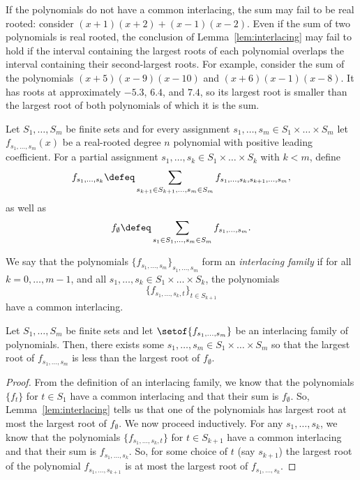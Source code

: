 \documentclass[11pt]{article}
\begin{document}
If the polynomials do not have a common interlacing, the sum may fail to be real rooted:
 consider $(x+1) (x+2) + (x-1) (x-2)$.
Even if the sum of two polynomials is real rooted, the conclusion of Lemma~\ref{lem:interlacing}
  may fail to hold if the interval containing the largest roots of each polynomial overlaps
  the interval containing their second-largest roots.
For example,
  consider the sum of the polynomials $(x+5) (x-9) (x-10)$ and
  $(x+6) (x-1) (x-8)$.
It has roots at approximately $-5.3$, $6.4$, and $7.4$, so 
  its largest root is smaller than the largest root of both polynomials
  of which it is the sum.

\begin{definition}\label{def:family}
Let $S_{1}, \dots , S_{m}$ be finite sets and for every assignment $s_{1}, \dots, s_{m} \in S_{1} \times \dots \times S_{m}$
  let $f_{s_{1}, \dots , s_{m}} (x)$ be a real-rooted degree $n$ polynomial with positive leading coefficient.
For a partial assignment $s_1, \dots, s_k \in S_1 \times \ldots \times S_k$ with $k < m$, define
\[
  f_{s_{1},\dots , s_{k}} \defeq
\sum_{s_{k+1} \in S_{k+1}, \dots , s_{m} \in S_{m}}
  f_{s_{1}, \dots ,s_{k}, s_{k+1}, \dots , s_{m}},
\]
as well as
\[
  f_{\emptyset} \defeq \sum_{s_{1} \in S_{1}, \dots , s_{m} \in S_{m}}
  f_{s_{1}, \dots , s_{m}}.
\]

We say that the polynomials $\{f_{s_{1}, \dots , s_{m}} \}_{s_{1}, \dots , s_{m}}$
  form an \textit{interlacing family} if for all $k=0,\ldots, m-1$, and all
  $s_{1}, \dots, s_{k} \in S_{1} \times \dots \times S_{k}$,
  the polynomials
\[
  \{f_{s_{1}, \dots , s_{k},t}\}_{t\in S_{k+1}}
\]
have a common interlacing.
\end{definition}

\begin{theorem}\label{thm:interlacing}
Let $S_{1}, \dots , S_{m}$
  be finite sets and let
 $\setof{f_{s_{1}, \dots , s_{m}} }$ be an interlacing family of polynomials.
Then, there exists some $s_{1},\dots , s_{m} \in S_{1} \times \dots \times S_{m}$
  so that the largest root of
  $f_{s_{1}, \dots , s_{m}}$ is less than the largest root of $f_{\emptyset}$.
\end{theorem}
\begin{proof}
From the definition of an interlacing family, we know that the polynomials $\{ f_t\}$ for ${t \in S_1}$
  have a common interlacing and that their sum is $f_{\emptyset}$.
So, Lemma~\ref{lem:interlacing} tells us that one of the polynomials has largest root at most the largest root of $f_{\emptyset}$.
We now proceed inductively.
For any $s_{1}, \dots , s_{k}$, we know that the polynomials
  $\{f_{s_{1}, \dots , s_k, t}\}$ for $t \in S_{k+1}$ have a common interlacing and
  that their sum is $f_{s_{1}, \dots , s_{k}}$.
So, for some choice of $t$ (say $s_{k+1}$) the largest root of the polynomial
  $f_{s_{1}, \dots , s_{k+1}}$
  is at most the largest root of
  $f_{s_{1}, \dots , s_{k}}$.
\end{proof}
\end{document}

